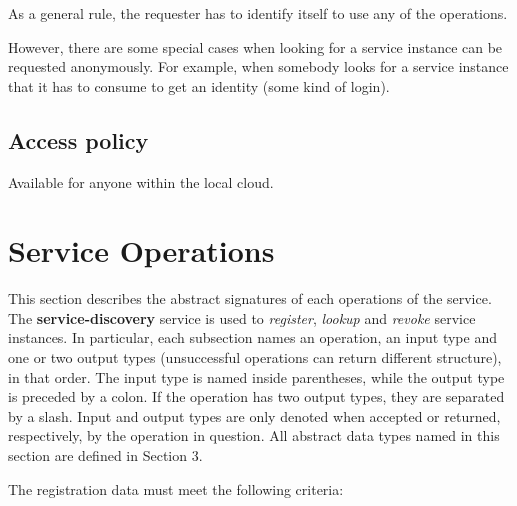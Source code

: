 \documentclass[a4paper]{arrowhead}
\begin{document}
As a general rule, the requester has to identify itself to use any of the operations.

However, there are some special cases when looking for a service instance can be requested anonymously.  For example, when somebody looks for a service instance that it has to consume to get an identity (some kind of login).

\subsection{Access policy}
\label{sec:accesspolicy}

Available for anyone within the local cloud.

\newpage

\section{Service Operations}
\label{sec:functions}

This section describes the abstract signatures of each operations of the service. The \textbf{service-discovery} service is used to \textit{register}, \textit{lookup} and \textit{revoke} service instances.
In particular, each subsection names an operation, an input type and one or two output types (unsuccessful operations can return different structure), in that order.
The input type is named inside parentheses, while the output type is preceded by a colon. If the operation has two output types, they are separated by a slash.
Input and output types are only denoted when accepted or returned, respectively, by the operation in question. All abstract data types named in this section are defined in Section 3.


The registration data must meet the following criteria:
\end{document}
